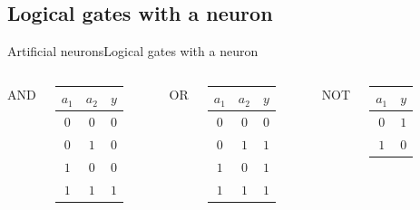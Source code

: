 \documentclass[10pt,compress]{beamer} %
\begin{document}
\subsection{Logical gates with a neuron}
\begin{frame}{Artificial neurons}{Logical gates with a neuron}
    \begin{columns}
	   		\centering AND\\
            

			 \begin{tabular}{ccc}\hline
			 $a_1$ & $a_2$ & $y$ \\\hline
			 $0$ & $0$ & $0$ \\
			 $0$ & $1$ & $0$ \\
			 $1$ & $0$ & $0$ \\
			 $1$ & $1$ & $1$ \\
			 \end{tabular}
	   		\centering OR\\
            

			 \begin{tabular}{ccc}\hline
			 $a_1$ & $a_2$ & $y$ \\\hline
			 $0$ & $0$ & $0$ \\
			 $0$ & $1$ & $1$ \\
			 $1$ & $0$ & $1$ \\
			 $1$ & $1$ & $1$ \\
			 \end{tabular}
	   		\centering NOT\\\bigskip
            
			\vspace{1cm}
			 \begin{tabular}{cc}\hline
			 $a_1$ & $y$ \\\hline
			 $0$ & $1$ \\
			 $1$ & $0$ \\
			 \end{tabular}
    \end{columns}
\end{frame}
\end{document}
